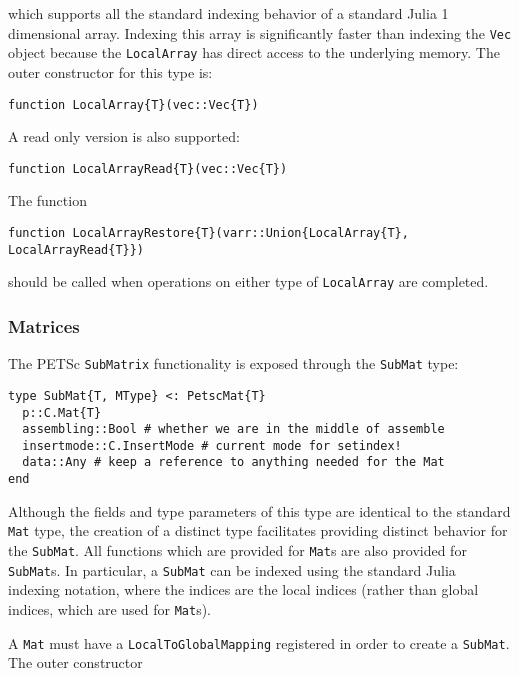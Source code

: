 \documentclass{article}
\begin{document}
\noindent which supports all the standard indexing behavior of a standard Julia 
1 dimensional array.  Indexing this array is significantly faster than 
indexing the \texttt{Vec} object because the \texttt{LocalArray} has direct
access to the underlying memory.
The outer constructor for this type is:

\begin{verbatim}
function LocalArray{T}(vec::Vec{T})
\end{verbatim}

\noindent A read only version is also supported:

\begin{verbatim}
function LocalArrayRead{T}(vec::Vec{T})
\end{verbatim}

\noindent The function 
\begin{verbatim}
function LocalArrayRestore{T}(varr::Union{LocalArray{T}, LocalArrayRead{T}})
\end{verbatim}

\noindent should be called when operations on either type of \texttt{LocalArray} are 
completed.

\subsubsection{Matrices}
The PETSc \texttt{SubMatrix} functionality is exposed through the 
\texttt{SubMat} type:
\begin{verbatim}
type SubMat{T, MType} <: PetscMat{T}
  p::C.Mat{T}
  assembling::Bool # whether we are in the middle of assemble
  insertmode::C.InsertMode # current mode for setindex!
  data::Any # keep a reference to anything needed for the Mat
end

\end{verbatim}

\noindent Although the fields and type parameters of this type are identical to the
standard \texttt{Mat} type, the creation of a distinct type facilitates
providing distinct behavior for the \texttt{SubMat}.  All functions which
are provided for \texttt{Mat}s are also provided for \texttt{SubMat}s.
In particular, a \texttt{SubMat} can be indexed using the standard Julia
indexing notation, where the indices are the local indices (rather than global
indices, which are used for \texttt{Mat}s).

A \texttt{Mat} must have a \texttt{LocalToGlobalMapping} registered in order
to create a \texttt{SubMat}.  The outer constructor
\end{document}
